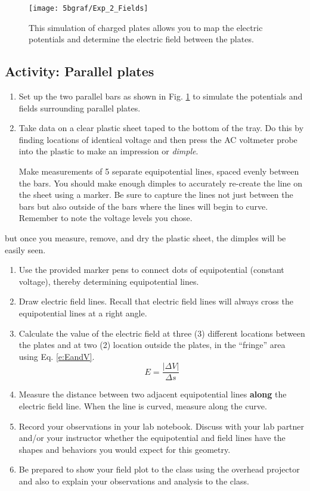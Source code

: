 \begin{figure}
	\centering
	\texttt{[image: 5bgraf/Exp\_2\_Fields]}
	\caption{This simulation of charged plates allows you to map the electric potentials and determine the electric field between the plates.}
	\label{f:fig1}
\end{figure}

\subsection{Activity: Parallel plates} %
\begin{enumerate}
	 \item Set up the two parallel bars as shown in Fig. \ref{f:fig1} to simulate the potentials and fields surrounding parallel plates.
	 \item  Take data on a clear plastic sheet taped to the bottom of the tray.  Do this by finding locations of identical voltage and then press the AC voltmeter probe into the plastic to make an impression or \textit{dimple}.
	 
	 Make measurements of 5 separate equipotential lines, spaced evenly between the bars.  You should make enough dimples to accurately re-create the line on the sheet using a marker.  Be sure to capture the lines not just between the bars but also outside of the bars where the lines will begin to curve.  Remember to note the voltage levels you chose.
\end{enumerate}
	  but once you measure, remove, and dry the plastic sheet, the dimples will be easily seen.  
\begin{enumerate}[resume]
	 \item Use the provided marker pens to connect dots of equipotential (constant voltage), thereby determining equipotential lines.
	  \item Draw electric field lines.  Recall that electric field lines will always cross the equipotential lines at a right angle.

	 \item Calculate the value of the electric field at three (3) different locations between the plates and at two (2) location outside the plates, in the ``fringe'' area using Eq. \ref{e:EandV}.
	 \[ E = \frac{|\Delta V|}{\Delta s} \]
	\item Measure the distance between two adjacent equipotential lines \textbf{along} the electric field line. When the line is curved, measure along the curve.
	\item Record your observations in your lab notebook.  Discuss with your lab partner and/or your instructor whether the equipotential and field lines have the shapes and behaviors you would expect for this geometry.
	\item Be prepared to show your field plot to the class using the overhead projector and also to explain your observations and analysis to the class.
\end{enumerate}

